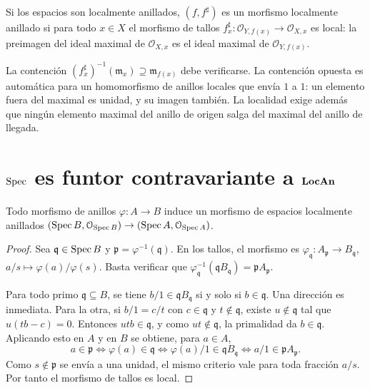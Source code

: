 \begin{defi}
\label{defi:s06-morfismo-espacios-localmente-anillados}
Si los espacios son localmente anillados, $(f,f^\sharp)$ es un morfismo localmente anillado si para todo $x\in X$ el morfismo de tallos $f_x^\sharp\colon \mathcal O_{Y,f(x)}\to\mathcal O_{X,x}$ es local: la preimagen del ideal maximal de $\mathcal O_{X,x}$ es el ideal maximal de $\mathcal O_{Y,f(x)}$.
\end{defi}

\begin{obs}
\label{obs:s06-contencion-f-x-1-m}
La contención $(f_x^\sharp)^{-1}(\mathfrak m_x)\supseteq\mathfrak m_{f(x)}$ debe verificarse. La contención opuesta es automática para un homomorfismo de anillos locales que envía $1$ a $1$: un elemento fuera del maximal es unidad, y su imagen también. La localidad exige además que ningún elemento maximal del anillo de origen salga del maximal del anillo de llegada.
\end{obs}

\section{\texorpdfstring{$\operatorname{Spec}$}{Spec} es funtor contravariante a \texorpdfstring{$\mathbf{LocAn}$}{espacios localmente anillados}}
\label{sec:s06-spec-funtor}

\begin{teo}
\label{teo:s06-todo-morfismo-anillos-b-induce}
Todo morfismo de anillos $\varphi\colon A\to B$ induce un morfismo de espacios localmente anillados $(\operatorname{Spec} B,\mathcal O_{\operatorname{Spec} B})\to(\operatorname{Spec} A,\mathcal O_{\operatorname{Spec} A})$.
\end{teo}
\begin{proof}
Sea $\mathfrak q\in\operatorname{Spec} B$ y $\mathfrak p=\varphi^{-1}(\mathfrak q)$. En los tallos, el morfismo es $\varphi_{\mathfrak q}\colon A_{\mathfrak p}\to B_{\mathfrak q}$, $a/s\mapsto\varphi(a)/\varphi(s)$. Basta verificar que $\varphi_{\mathfrak q}^{-1}(\mathfrak qB_{\mathfrak q})=\mathfrak pA_{\mathfrak p}$.

Para todo primo $\mathfrak q\subseteq B$, se tiene $b/1\in\mathfrak qB_{\mathfrak q}$ si y solo si $b\in\mathfrak q$. Una dirección es inmediata. Para la otra, si $b/1=c/t$ con $c\in\mathfrak q$ y $t\notin\mathfrak q$, existe $u\notin\mathfrak q$ tal que $u(tb-c)=0$. Entonces $utb\in\mathfrak q$, y como $ut\notin\mathfrak q$, la primalidad da $b\in\mathfrak q$. Aplicando esto en $A$ y en $B$ se obtiene, para $a\in A$,
\[
a\in\mathfrak p\iff\varphi(a)\in\mathfrak q
\iff\varphi(a)/1\in\mathfrak qB_{\mathfrak q}
\iff a/1\in\mathfrak pA_{\mathfrak p}.
\]
Como $s\notin\mathfrak p$ se envía a una unidad, el mismo criterio vale para toda fracción $a/s$. Por tanto el morfismo de tallos es local.
\end{proof}

